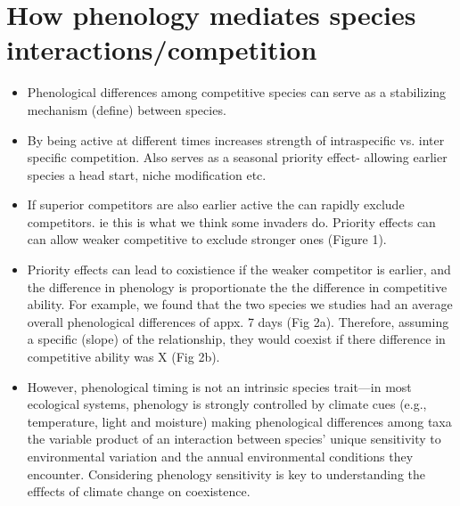 \documentclass{article}[12pt]
\begin{document}
\section*{How phenology mediates species interactions/competition}
\begin{itemize}
\item Phenological differences among competitive species can serve as a stabilizing mechanism (define) between species.
\item By being active at different times increases strength of intraspecific vs. inter specific competition. Also serves as a seasonal priority effect- allowing earlier species a head start, niche modification etc.
\item If superior competitors are also earlier active the can rapidly exclude competitors. ie this is what we think some invaders do. Priority effects can can allow weaker competitive to exclude stronger ones (Figure 1).

\item Priority effects can lead to coxistience if the weaker competitor is earlier, and the difference in phenology is proportionate the the difference in competitive ability. For example, we found that the two species we studies had an average overall phenological differences of appx. 7 days (Fig 2a). Therefore, assuming a specific (slope) of the relationship, they would coexist if there difference in competitive ability was X (Fig 2b).

\item However, phenological timing is not an intrinsic species trait---in most ecological systems, phenology is strongly controlled by climate cues (e.g., temperature, light and moisture) making phenological differences among taxa the variable product of an interaction between species’ unique sensitivity to environmental variation and the annual environmental conditions they encounter. Considering phenology sensitivity is key to understanding the efffects of climate change on coexistence.
\end{itemize}
\end{document}
